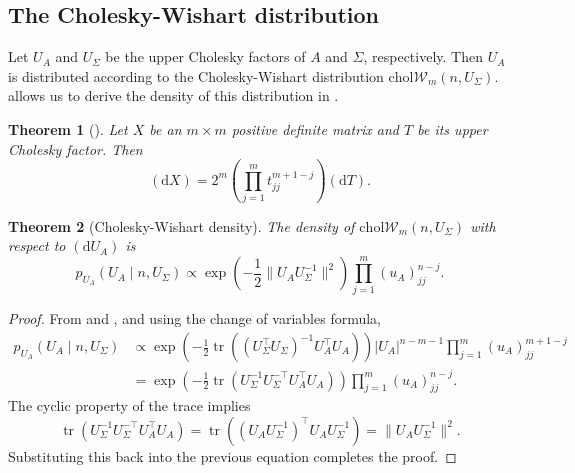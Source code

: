\documentclass[12pt,a4paper,reqno]{amsart}
\numberwithin{equation}{section}
\newtheorem{theorem}{Theorem}[section]
\newcommand{\cholwishart}[1]{\mathrm{chol}\mathcal{W}_{#1}}
\renewcommand{\det}[1]{\left| {#1} \right|}
\newcommand{\dmeasure}[1]{\left(\dd{#1}\right)}
\newcommand{\dd}[1]{\mathrm{d}{#1}}
\newcommand{\tr}{\operatorname{tr}}
\begin{document}
\subsection*{The Cholesky-Wishart distribution}

Let $U_A$ and $U_\Sigma$ be the upper Cholesky factors of $A$ and $\Sigma$, respectively.
Then $U_A$ is distributed according to the Cholesky-Wishart distribution $\cholwishart{m}(n, U_\Sigma)$.
 allows us to derive the density of this distribution in .

\begin{theorem}[{\cite[Theorem 2.1.9]{muirhead_aspects_1982}}]\label{thm:choleskydetjac}
    Let $X$ be an $m \times m$ positive definite matrix and $T$ be its upper Cholesky factor.
    Then
    \begin{equation}\label{eq:choleskydetjac}
        \dmeasure{X} = 2^m \left(\prod_{j=1}^m t_{jj}^{m+1-j} \right) \dmeasure{T}.
    \end{equation}
\end{theorem}

\begin{theorem}[Cholesky-Wishart density]\label{thm:cholwishartdensity}
    The density of $\cholwishart{m}(n, U_\Sigma)$ with respect to $\dmeasure{U_A} $ is
    \begin{equation}\label{eq:cholwishartdensity}
        p_{U_A}(U_A \mid n, U_\Sigma) \propto \exp\left(-\frac{1}{2}\lVert U_A U_\Sigma^{-1} \rVert^2\right) \prod_{j=1}^m (u_A)_{jj}^{n-j}.
    \end{equation}
\end{theorem}
\begin{proof}
    From  and , and using the change of variables formula,
    \begin{align*}
        p_{U_A}(U_A \mid n, U_\Sigma) & \propto \exp\left(-\frac{1}{2}\tr((U_\Sigma^\top U_\Sigma)^{-1} U_A^\top U_A)\right) \det{U_A}^{n-m-1} \prod_{j=1}^m (u_A)_{jj}^{m+1-j} \\
                                      & = \exp\left(-\frac{1}{2}\tr(U_\Sigma^{-1} U_\Sigma^{-\top} U_A^\top U_A)\right) \prod_{j=1}^m (u_A)_{jj}^{n-j}.
    \end{align*}
    The cyclic property of the trace implies
    \[\tr(U_\Sigma^{-1} U_\Sigma^{-\top} U_A^\top U_A) = \tr((U_A U_\Sigma^{-1})^\top U_A U_\Sigma^{-1}) = \lVert U_A U_\Sigma^{-1} \rVert^2.\]
    Substituting this back into the previous equation completes the proof.
\end{proof}
\end{document}
